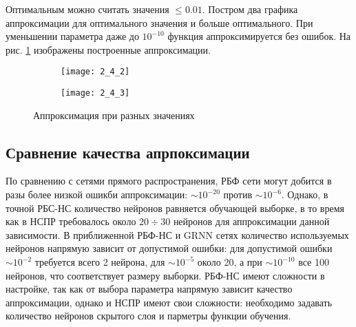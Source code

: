 Оптимальным можно считать значения  $\leq 0.01$. Постром два графика аппроксимации для оптимального значения  и больше оптимального. При уменьшении параметра даже до $10^{-10}$ функция аппроксимируется без ошибок. На рис. \ref{fig:2_4_2} изображены построенные аппроксимации.
\begin{figure}[H]
\begin{center}
	\begin{subfigure}{0.49\textwidth}
		\texttt{[image: 2\_4\_2]}
		\caption{}
	\end{subfigure}
	\begin{subfigure}{0.49\textwidth}
		\texttt{[image: 2\_4\_3]}
		\caption{}
	\end{subfigure}
	\caption{Аппроксимация при разных значениях }
	\label{fig:2_4_2}
\end{center}
\end{figure}

\subsection{Сравнение качества апрпоксимации}


По сравнению с сетями прямого распространения, РБФ сети могут добится в разы более низкой ошикби аппроксимации: $\sim 10^{-20}$ против $\sim 10^{-6}$. Однако, в точной РБС-НС количество нейронов равняется обучающей выборке, в то время как в НСПР требовалось около $20 \div 30$ нейронов для аппроксимации данной зависимости. В приближенной РБФ-НС и GRNN сетях количество используемых нейронов напрямую зависит от допустимой ошибки: для допустимой ошибки $\sim 10^{-2}$ требуется всего 2 нейрона, для $\sim 10^{-5}$ около 20, а при $\sim 10^{-10}$ все 100 нейронов, что соответствует размеру выборки. РБФ-НС имеют сложности в настройке, так как от выбора параметра  напрямую зависит качество аппроксимации, однако и НСПР имеют свои сложности:  необходимо задавать количество нейронов скрытого слоя и парметры функции обучения.

